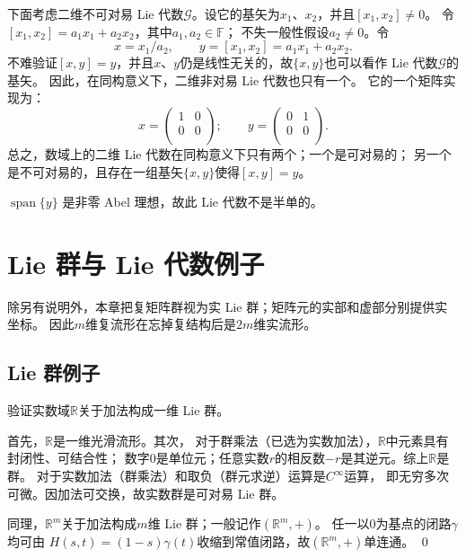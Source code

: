 下面考虑二维不可对易 Lie 代数$\mathscr{G}$。设它的基矢为$x_1$、$x_2$，并且$[x_1,x_2]\neq 0$。
令$[x_1,x_2]= a_1 x_1+ a_2 x_2$，其中$a_1,a_2\in \mathbb{F}$；
不失一般性假设$a_2\neq 0$。令
\begin{equation}
    x = x_1 / a_2,\qquad
    y = [x_1,x_2]= a_1 x_1+ a_2 x_2.
\end{equation}
不难验证$[x,y]=y$，并且$x$、$y$仍是线性无关的，故$\{x,y\}$也可以看作 Lie 代数$\mathscr{G}$的基矢。
因此，在同构意义下，二维非对易 Lie 代数也只有一个。
它的一个矩阵实现为：
\begin{equation}
    x=\left(
    \begin{array}{cc}
        1 & 0 \\
        0 & 0 \\
    \end{array}\right);\qquad
    y=\left(
    \begin{array}{cc}
        0 & 1 \\
        0 & 0 \\
    \end{array}
    \right).
\end{equation}
总之，数域上的二维 Lie 代数在同构意义下只有两个；一个是可对易的；
另一个是不可对易的，且存在一组基矢$\{x,y\}$使得$[x,y]=y$。

$\operatorname{span}\{y\}$ 是非零 Abel 理想，故此 Lie 代数不是半单的。

\section{Lie 群与 Lie 代数例子}
除另有说明外，本章把复矩阵群视为实 Lie 群；矩阵元的实部和虚部分别提供实坐标。
因此$m$维复流形在忘掉复结构后是$2m$维实流形。

\subsection{Lie 群例子}
\begin{example}\label{chlg:exam_Rplus}
    验证实数域$\mathbb{R}$关于加法构成一维 Lie 群。

    首先，$\mathbb{R}$是一维光滑流形。其次，
    对于群乘法（已选为实数加法），$\mathbb{R}$中元素具有封闭性、可结合性；
    数字$0$是单位元；任意实数$r$的相反数$-r$是其逆元。综上$\mathbb{R}$是群。
    对于实数加法（群乘法）和取负（群元求逆）运算是$C^\infty$运算，
    即无穷多次可微。因加法可交换，故实数群是可对易 Lie 群。

    同理，$\mathbb{R}^m$关于加法构成$m$维 Lie 群；一般记作$(\mathbb{R}^m,+)$。
    任一以$0$为基点的闭路$\gamma$均可由
    $H(s,t)=(1-s)\gamma(t)$收缩到常值闭路，故$(\mathbb R^m,+)$单连通。 \qed
\end{example}

